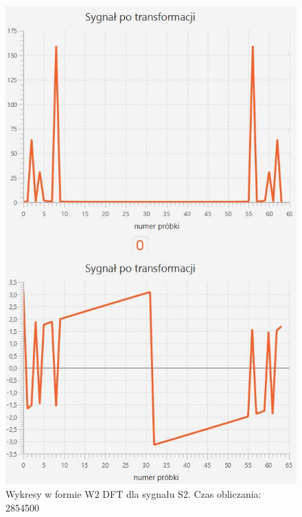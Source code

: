 \documentclass[12pt]{article}
\begin{document}
\begin{figure}[H]
	\centering
	\includegraphics[width=.8\linewidth]{DFT-S2-W2}
	\caption{Wykresy w formie W2 DFT dla sygnału S2. Czas obliczania: 2854500}
	\label{S3_sygnal}
\end{figure}
\end{document}
